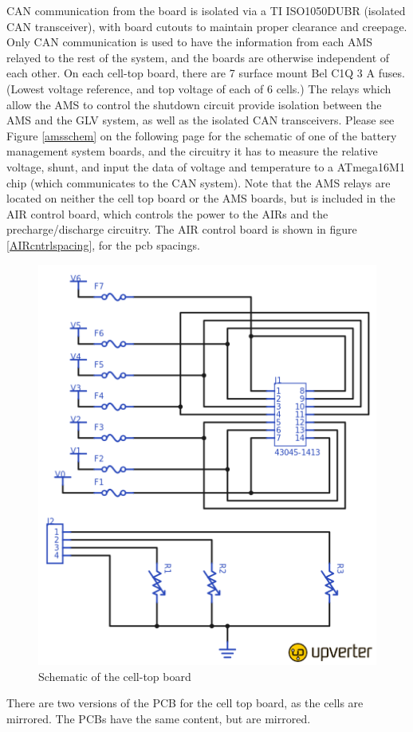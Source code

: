 \documentclass{article}
\begin{document}
    CAN communication from the board is isolated via a TI ISO1050DUBR (isolated CAN transceiver), with board cutouts to maintain proper clearance and creepage. Only CAN communication is used to have the information from each AMS relayed to the rest of the system, and the boards are otherwise independent of each other. On each cell-top board, there are 7 surface mount Bel C1Q 3 A fuses. (Lowest voltage reference, and top voltage of each of 6 cells.) The relays which allow the AMS to control the shutdown circuit provide isolation between the AMS and the GLV system, as well as the isolated CAN transceivers. Please see Figure \ref{amsschem} on the following page for the schematic of one of the battery management system boards, and the circuitry it has to measure the relative voltage, shunt, and input the data of voltage and temperature to a ATmega16M1 chip (which communicates to the CAN system). Note that the AMS relays are located on neither the cell top board or the AMS boards, but is included in the AIR control board, which controls the power to the AIRs and the precharge/discharge circuitry. The AIR control board is shown in figure \ref{AIRcntrlspacing}, for the pcb spacings. %


        \begin{figure}[H]
            \centering
            \includegraphics[width = 0.4 \textwidth]{celltopschem}
            \caption{Schematic of the cell-top board}
            \label{celltopschem}
        \end{figure}

        There are two versions of the PCB for the cell top board, as the cells are mirrored. The PCBs have the same content, but are mirrored.
\end{document}
